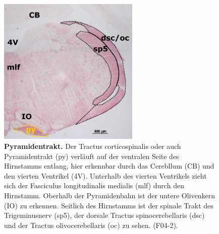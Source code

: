 \documentclass[12pt,a4paper,pdftex]{article}
\begin{document}
\begin{figure}[H]
    \centering
    \includegraphics[width=0.6\textwidth]{pictures/Bilder_Laura/py_F04_2P_025x.png}
    \caption[Pyramidentrakt]{\textbf{Pyramidentrakt.} Der Tractus corticospinalis oder auch Pyramidentrakt (py) verläuft auf der ventralen Seite des Hirnstamms entlang, hier erkennbar durch das Cerebllum (CB) und den vierten Ventrikel (4V). Unterhalb des vierten Ventrikels zieht sich der Fasciculus longitudinalis medialis (mlf) durch den Hirnstamm. Oberhalb der Pyramidenbahn ist der untere Olivenkern (IO) zu erkennen. Seitlich des Hirnstamms ist der spinale Trakt des Trigeminusnerv (sp5), der dorsale Tractus spinocerebellaris (dsc) und der Tractus olivocerebellaris (oc) zu sehen. (F04-2).}
    \label{fig:pyramidentrakt}
\end{figure}
\end{document}
